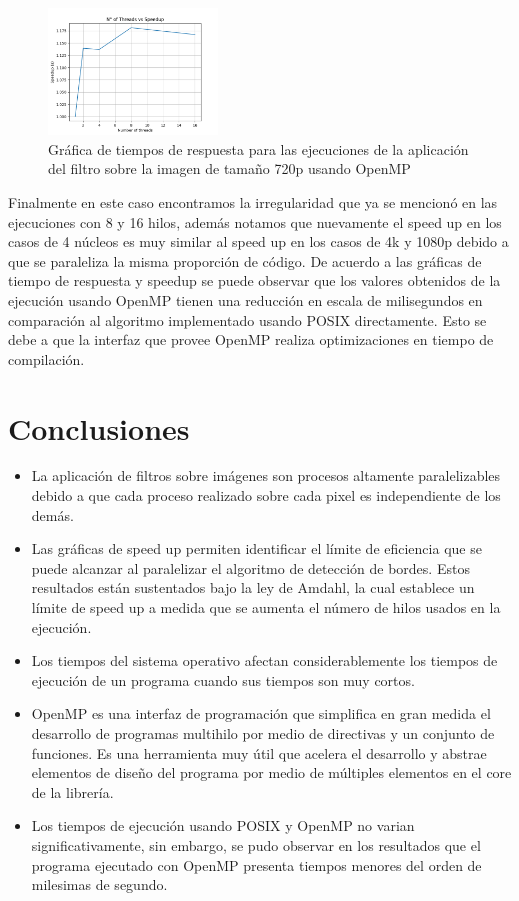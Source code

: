 \begin{figure}[H]
    \centering
    \includegraphics[width=0.4\textwidth]{../plots/omp_720p_speedup.png}
    \caption{Gráfica de tiempos de respuesta para las ejecuciones de la aplicación del filtro sobre la imagen de tamaño 720p usando OpenMP}
\end{figure}

Finalmente en este caso encontramos la irregularidad que ya se mencionó en las ejecuciones con 8 y 16 hilos, además notamos que nuevamente el speed up en los casos de 4 núcleos es muy similar al speed up en los casos de 4k y 1080p debido a que se paraleliza la misma proporción de código.
De acuerdo a las gráficas de tiempo de respuesta y speedup se puede observar que los valores obtenidos de la ejecución usando OpenMP tienen una reducción en escala de milisegundos en comparación al algoritmo implementado usando POSIX directamente. Esto se debe a que la interfaz que provee OpenMP realiza optimizaciones en tiempo de compilación.

\section{Conclusiones}

\begin{itemize}
    \item La aplicación de filtros sobre imágenes son procesos altamente paralelizables debido a que cada proceso realizado sobre cada pixel es independiente de los demás.
    \item Las gráficas de speed up permiten identificar el límite de eficiencia que se puede alcanzar al paralelizar el algoritmo de detección de bordes. Estos resultados están sustentados bajo la ley de Amdahl, la cual establece un límite de speed up a medida que se aumenta el número de hilos usados en la ejecución.
    \item Los tiempos del sistema operativo afectan considerablemente los tiempos de ejecución de un programa cuando sus tiempos son muy cortos.
    \item OpenMP es una interfaz de programación que simplifica en gran medida el desarrollo de programas multihilo por medio de directivas y un conjunto de funciones. Es una herramienta muy útil que acelera el desarrollo y abstrae elementos de diseño del programa por medio de múltiples elementos en el core de la librería.
    \item Los tiempos de ejecución usando POSIX y OpenMP no varian significativamente, sin embargo, se pudo observar en los resultados que el programa ejecutado con OpenMP presenta tiempos menores del orden de milesimas de segundo.
\end{itemize}


